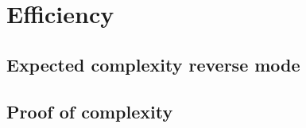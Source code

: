 \section{Efficiency}

\subsection{Expected complexity reverse mode} %
\label{sub:expected_complexity_reverse_mode}


\subsection{Proof of complexity} %
\label{sub:proof_of_complexity}

